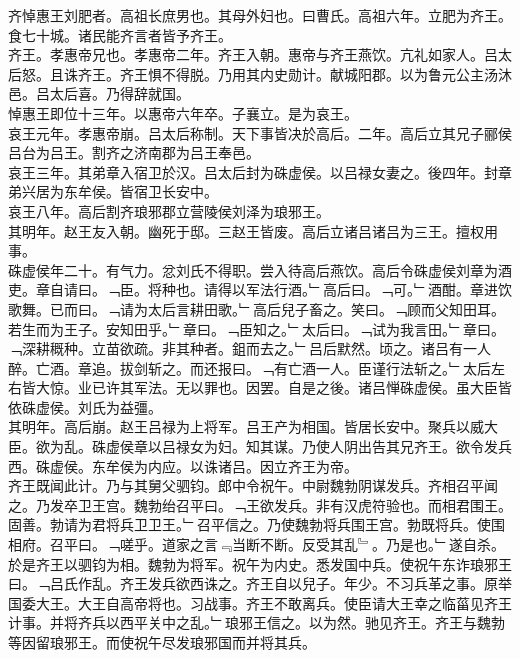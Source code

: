 \documentclass{zhvt-classic}
\begin{document}

\hspace*{2em}齐悼惠王刘肥者。高祖长庶男也。其母外妇也。曰曹氏。高祖六年。立肥为齐王。食七十城。诸民能齐言者皆予齐王。\\
\hspace*{2em}齐王。孝惠帝兄也。孝惠帝二年。齐王入朝。惠帝与齐王燕饮。亢礼如家人。吕太后怒。且诛齐王。齐王惧不得脱。乃用其内史勋计。献城阳郡。以为鲁元公主汤沐邑。吕太后喜。乃得辞就国。\\
\hspace*{2em}悼惠王即位十三年。以惠帝六年卒。子襄立。是为哀王。\\
\hspace*{2em}哀王元年。孝惠帝崩。吕太后称制。天下事皆决於高后。二年。高后立其兄子郦侯吕台为吕王。割齐之济南郡为吕王奉邑。\\
\hspace*{2em}哀王三年。其弟章入宿卫於汉。吕太后封为硃虚侯。以吕禄女妻之。後四年。封章弟兴居为东牟侯。皆宿卫长安中。\\
\hspace*{2em}哀王八年。高后割齐琅邪郡立营陵侯刘泽为琅邪王。\\
\hspace*{2em}其明年。赵王友入朝。幽死于邸。三赵王皆废。高后立诸吕诸吕为三王。擅权用事。\\
\hspace*{2em}硃虚侯年二十。有气力。忿刘氏不得职。尝入待高后燕饮。高后令硃虚侯刘章为酒吏。章自请曰。﹁臣。将种也。请得以军法行酒。﹂高后曰。﹁可。﹂酒酣。章进饮歌舞。已而曰。﹁请为太后言耕田歌。﹂高后兒子畜之。笑曰。﹁顾而父知田耳。若生而为王子。安知田乎。﹂章曰。﹁臣知之。﹂太后曰。﹁试为我言田。﹂章曰。﹁深耕穊种。立苗欲疏。非其种者。鉏而去之。﹂吕后默然。顷之。诸吕有一人醉。亡酒。章追。拔剑斩之。而还报曰。﹁有亡酒一人。臣谨行法斩之。﹂太后左右皆大惊。业已许其军法。无以罪也。因罢。自是之後。诸吕惮硃虚侯。虽大臣皆依硃虚侯。刘氏为益彊。\\
\hspace*{2em}其明年。高后崩。赵王吕禄为上将军。吕王产为相国。皆居长安中。聚兵以威大臣。欲为乱。硃虚侯章以吕禄女为妇。知其谋。乃使人阴出告其兄齐王。欲令发兵西。硃虚侯。东牟侯为内应。以诛诸吕。因立齐王为帝。\\
\hspace*{2em}齐王既闻此计。乃与其舅父驷钧。郎中令祝午。中尉魏勃阴谋发兵。齐相召平闻之。乃发卒卫王宫。魏勃绐召平曰。﹁王欲发兵。非有汉虎符验也。而相君围王。固善。勃请为君将兵卫卫王。﹂召平信之。乃使魏勃将兵围王宫。勃既将兵。使围相府。召平曰。﹁嗟乎。道家之言﹃当断不断。反受其乱﹄。乃是也。﹂遂自杀。於是齐王以驷钧为相。魏勃为将军。祝午为内史。悉发国中兵。使祝午东诈琅邪王曰。﹁吕氏作乱。齐王发兵欲西诛之。齐王自以兒子。年少。不习兵革之事。原举国委大王。大王自高帝将也。习战事。齐王不敢离兵。使臣请大王幸之临菑见齐王计事。并将齐兵以西平关中之乱。﹂琅邪王信之。以为然。驰见齐王。齐王与魏勃等因留琅邪王。而使祝午尽发琅邪国而并将其兵。\\
\end{document}
